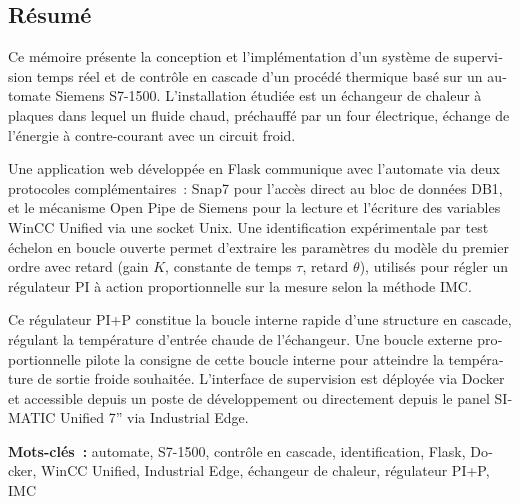 \begin{otherlanguage}{french}
\chapter*{Résumé}

\noindent
Ce mémoire présente la conception et l'implémentation d'un système de supervision temps réel
et de contrôle en cascade d'un procédé thermique basé sur un automate Siemens S7-1500.
L'installation étudiée est un échangeur de chaleur à plaques dans lequel un fluide chaud, 
préchauffé par un four électrique, échange de l'énergie à contre-courant avec un circuit
froid.

Une application web développée en Flask communique avec l'automate via deux protocoles
complémentaires~: Snap7 pour l'accès direct au bloc de données DB1, et le mécanisme Open
Pipe de Siemens pour la lecture et l'écriture des variables WinCC Unified via une socket Unix.
Une identification expérimentale par test échelon en boucle ouverte permet d'extraire les
paramètres du modèle du premier ordre avec retard (gain $K$, constante de temps $\tau$,
retard $\theta$), utilisés pour régler un régulateur PI à action proportionnelle sur la mesure
selon la méthode IMC.

Ce régulateur PI+P constitue la boucle interne rapide d'une structure en cascade, régulant
la température d'entrée chaude de l'échangeur. Une boucle externe proportionnelle pilote
la consigne de cette boucle interne pour atteindre la température de sortie froide souhaitée.
L'interface de supervision est déployée via Docker et accessible depuis un poste de
développement ou directement depuis le panel SIMATIC Unified 7'' via Industrial Edge.

\medskip
\noindent\textbf{Mots-clés~:} automate, S7-1500, contrôle en cascade, identification,
Flask, Docker, WinCC Unified, Industrial Edge, échangeur de chaleur, régulateur PI+P, IMC
\end{otherlanguage}
